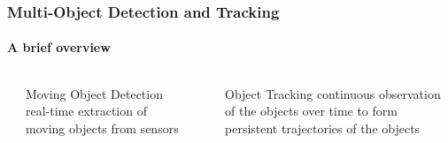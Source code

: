 \begin{frame}
	\frametitle{Multi-Object Detection and Tracking}
	\framesubtitle{A brief overview}
	
	\begin{columns}[t]
		\centering
		
		{
			\vspace{0.2cm}
		}
		
		{
			\begin{block}{Moving Object Detection}
				real-time extraction of moving objects from sensors
			\end{block}
		}
		
		{
			\vspace{2.84cm}
		}
		
		\vspace{1.0cm}
		
		{
			\begin{block}{Object Tracking\cite{Yilmaz06}}
				continuous observation of the objects over time to form persistent trajectories of the objects
			\end{block}
		}
		
		\centering
		
		{
		}
		

\end{columns}
\end{frame}
